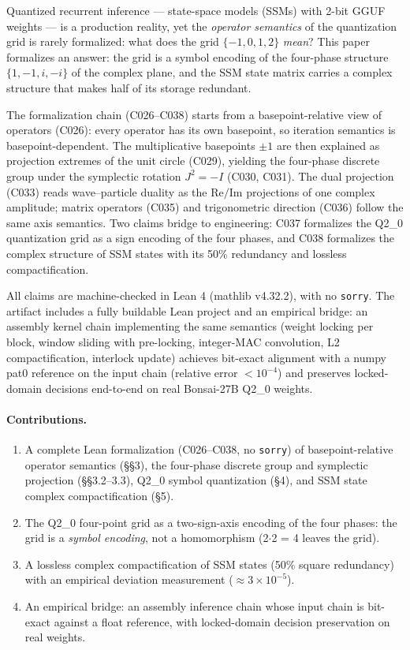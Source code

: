 \documentclass[sigplan,10pt,anonymous,review]{acmart}
\begin{document}
Quantized recurrent inference --- state-space models (SSMs) with 2-bit GGUF
weights --- is a production reality, yet the \emph{operator semantics} of the
quantization grid is rarely formalized: what does the grid $\{-1,0,1,2\}$
\emph{mean}? This paper formalizes an answer: the grid is a symbol encoding of
the four-phase structure $\{1,-1,i,-i\}$ of the complex plane, and the SSM state
matrix carries a complex structure that makes half of its storage redundant.

The formalization chain (C026--C038) starts from a basepoint-relative view of
operators (C026): every operator has its own basepoint, so iteration semantics
is basepoint-dependent. The multiplicative basepoints $\pm1$ are then explained
as projection extremes of the unit circle (C029), yielding the four-phase
discrete group under the symplectic rotation $J^2=-I$ (C030, C031). The dual
projection (C033) reads wave--particle duality as the $\mathrm{Re}/\mathrm{Im}$
projections of one complex amplitude; matrix operators (C035) and
trigonometric direction (C036) follow the same axis semantics. Two claims bridge
to engineering: C037 formalizes the Q2\_0 quantization grid as a sign encoding
of the four phases, and C038 formalizes the complex structure of SSM states
with its 50\% redundancy and lossless compactification.

All claims are machine-checked in Lean 4 (mathlib v4.32.2), with no
\texttt{sorry}. The artifact includes a fully buildable Lean project and an
empirical bridge: an assembly kernel chain implementing the same semantics
(weight locking per block, window sliding with pre-locking, integer-MAC
convolution, L2 compactification, interlock update) achieves bit-exact
alignment with a numpy pat0 reference on the input chain (relative error
$<10^{-4}$) and preserves locked-domain decisions end-to-end on real
Bonsai-27B Q2\_0 weights.

\paragraph{Contributions.}
\begin{enumerate}
\item A complete Lean formalization (C026--C038, no \texttt{sorry}) of
basepoint-relative operator semantics (\S\S3), the four-phase discrete group and
symplectic projection (\S\S3.2--3.3), Q2\_0 symbol quantization (\S4), and SSM
state complex compactification (\S5).
\item The Q2\_0 four-point grid as a two-sign-axis encoding of the four phases:
the grid is a \emph{symbol encoding}, not a homomorphism (2$\cdot$2 = 4 leaves
the grid).
\item A lossless complex compactification of SSM states (50\% square redundancy)
with an empirical deviation measurement ($\approx 3\times10^{-5}$).
\item An empirical bridge: an assembly inference chain whose input chain is
bit-exact against a float reference, with locked-domain decision preservation
on real weights.
\end{enumerate}
\end{document}
